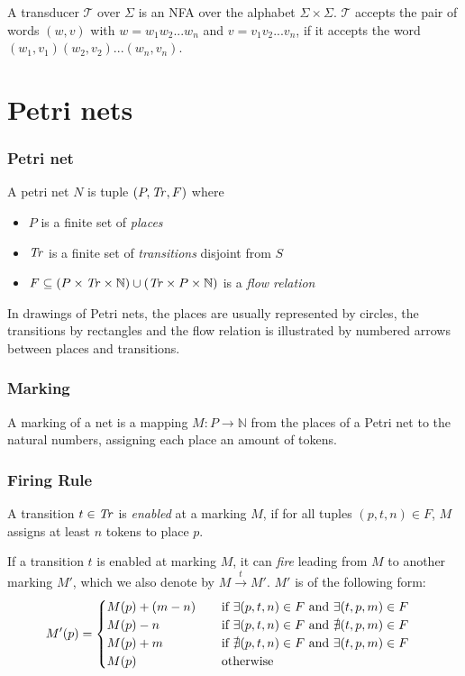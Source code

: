 A transducer $\mathcal{T}$ over $\Sigma$ is an NFA over the alphabet $\Sigma \times \Sigma$. $\mathcal{T}$ accepts the pair of words $(w,v)$ with $w = w_{1}w_{2}...w_{n}$ and $v=v_{1}v_{2}...v_{n}$, if it accepts the word $(w_{1},v_{1})(w_{2},v_{2})...(w_{n},v_{n})$.


\section{Petri nets}

\subsubsection{Petri net}

A petri net $N$ is tuple $(P,\mathit{Tr},F)$ where 
\begin{itemize}[-,noitemsep]
	\item $P$ is a finite set of \emph{places}
	\item $\mathit{Tr}$ is a finite set of \emph{transitions} disjoint from $S$
	\item $F \subseteq (P \times \mathit{Tr} \times \mathbb{N}) \cup (\mathit{Tr} \times P \times \mathbb{N})$ is a \emph{flow relation}
\end{itemize}

In drawings of Petri nets, the places are usually represented by circles, the transitions by rectangles and the flow relation is illustrated by numbered arrows between places and transitions.

\subsubsection{Marking}
A marking of a net is a mapping $M : P \rightarrow \mathbb{N}$ from the places of a Petri net to the natural numbers, assigning each place an amount of tokens.


\subsubsection{Firing Rule}
A transition $t \in \mathit{Tr}$ is \emph{enabled} at a marking $M$, if for all tuples $(p,t,n) \in F$, $M$ assigns at least $n$ tokens to place $p$.

If a transition $t$ is enabled at marking $M$, it can \emph{fire} leading from $M$ to another marking $M'$, which we also denote by  $M \xrightarrow{t} M'$. 
$M'$ is of the following form:
\begin{equation*}
M'(p) =  
\begin{cases}
\mathrlap{M(p) + (m - n)}\hphantom{M(p) + (m - n) + 1} \text{ if } \exists (p,t,n) \in F \text{ and } \exists (t,p,m) \in F \\
\mathrlap{M(p) - n}\hphantom{M(p) + (m - n) + 1} \text{ if } \exists (p,t,n) \in F \text{ and } \nexists (t,p,m) \in F \\
\mathrlap{M(p) + m}\hphantom{M(p) + (m - n) + 1} \text{ if }  \nexists (p,t,n) \in F \text{ and } \exists (t,p,m) \in F  \\
\mathrlap{M(p)}\hphantom{M(p) + (m - n) + 1} \text{ otherwise}
\end{cases}
\end{equation*}

